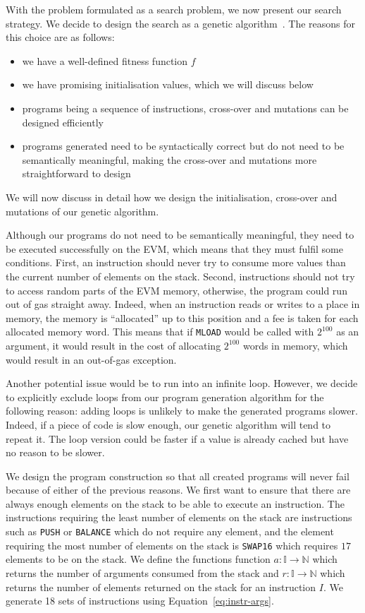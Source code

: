 With the problem formulated as a search problem, we now present our search strategy. We decide to design the search as a genetic algorithm~\cite{whitley1994genetic}. The reasons for this choice are as follows:

\begin{itemize}
  \item we have a well-defined fitness function $f$
  \item we have promising initialisation values, which we will discuss below
  \item programs being a sequence of instructions, cross-over and mutations can be designed efficiently
  \item programs generated need to be syntactically correct but do not need to be semantically meaningful, making the cross-over and mutations more straightforward to design
\end{itemize}
%
We will now discuss in detail how we design the initialisation, cross-over and mutations of our genetic algorithm.

Although our programs do not need to be semantically meaningful, they need to be executed successfully on the EVM, which means that they must fulfil some conditions. First, an instruction should never try to consume more values than the current number of elements on the stack. Second, instructions should not try to access random parts of the EVM memory, otherwise, the program could run out of gas straight away. Indeed, when an instruction reads or writes to a place in memory, the memory is ``allocated'' up to this position and a fee is taken for each allocated memory word. This means that if \lstinline{MLOAD} would be called with $2^{100}$ as an argument, it would result in the cost of allocating $2^{100}$ words in memory, which would result in an out-of-gas exception.

  Another potential issue would be to run into an infinite loop. However, we decide to explicitly exclude loops from our program generation algorithm for the following reason: adding loops is unlikely to make the generated programs slower. Indeed, if a piece of code is slow enough, our genetic algorithm will tend to repeat it. The loop version could be faster if a value is already cached but have no reason to be slower.

  We design the program construction so that all created programs will never fail because of either of the previous reasons. We first want to ensure that there are always enough elements on the stack to be able to execute an instruction. The instructions requiring the least number of elements on the stack are instructions such as \lstinline{PUSH} or \lstinline{BALANCE} which do not require any element, and the element requiring the most number of elements on the stack is \lstinline{SWAP16} which requires $17$ elements to be on the stack.
  We define the functions function $a : \mathbb{I} \rightarrow \mathbb{N}$ which returns the number of arguments consumed from the stack and $r : \mathbb{I} \rightarrow \mathbb{N}$ which returns the number of elements returned on the stack for an instruction $I$. We generate 18 sets of instructions using Equation~\ref{eq:instr-args}.

